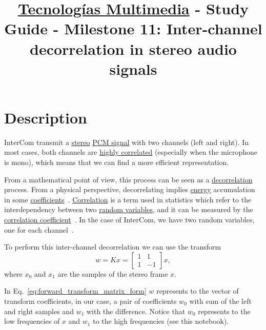 \title{\href{https://www.ual.es/estudios/grados/presentacion/plandeestudios/asignatura/4015/40154321?idioma=zh_CN}{Tecnologías Multimedia} - Study Guide - Milestone 11: Inter-channel decorrelation in stereo audio signals}

\maketitle

\section{Description}

InterCom transmit
a \href{https://en.wikipedia.org/wiki/Stereophonic_sound}{stereo}
\href{https://en.wikipedia.org/wiki/Pulse-code_modulation}{PCM
signal} with two channels (left and right). In most cases, both
channels
are \href{https://en.wikipedia.org/wiki/Binaural_recording}{highly
correlated} (especially when the microphone is mono), which means that
we can find a more efficient representation.

From a mathematical point of view, this process can be seen as a
\href{https://en.wikipedia.org/wiki/Decorrelation}{decorrelation}
process. From a physical perspective, decorrelating implies \href{https://en.wikipedia.org/wiki/Energy_(signal_processing)}{energy}
accumulation in some
\href{https://web.stanford.edu/class/ee398a/handouts/lectures/07-TransformCoding.pdf}{coefficients}~\cite{sayood2017introduction}. \href{https://en.wikipedia.org/wiki/Correlation_and_dependence}{Correlation}
is a term used in statistics which refer to the interdependency
between
two \href{https://en.wikipedia.org/wiki/Random_variable}{random
variables}, and it can be measured by the
\href{https://www.mathsisfun.com/data/correlation.html}{correlation
  coefficient}~\cite{thinkstats}. In the case of InterCom, we have two
  random variables, one for each channel~\cite{bosi2003intro}.

To perform this inter-channel decorrelation we can use the transform
\begin{equation}
  w = Kx = \begin{bmatrix} 1 & 1 \\ 1 & -1 \end{bmatrix}x,
  \label{eq:forward_transform_matrix_form}
\end{equation}
where $x_0$ and $x_1$ are the samples of the stereo frame $x$.

In Eq.~\ref{eq:forward_transform_matrix_form} $w$ represents to the
vector of transform coefficients, in our case, a pair of coefficients
$w_0$ with sum of the left and right samples and $w_1$ with the
difference. Notice that $w_0$ represents to the low frequencies of
$x$ and $w_1$ to the high frequencies (see this notebook).

